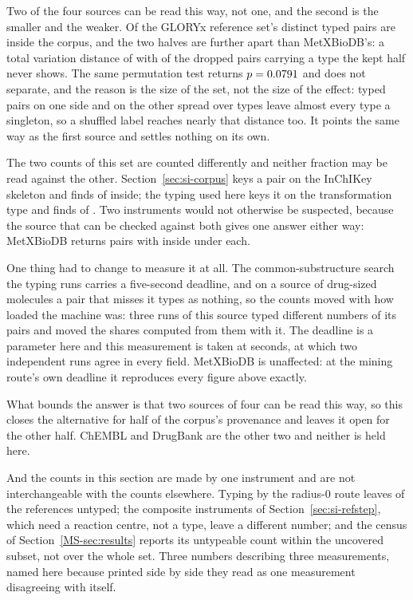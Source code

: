\documentclass[journal=jcisd8,manuscript=suppinfo,layout=onecolumn]{achemso}
\begin{document}
Two of the four sources can be read this way, not one, and the second is the smaller and the
weaker. Of the GLORYx reference set's \numGloryxdropPairs{} distinct typed pairs
\numGloryxdropInside{} are inside the corpus, and the two halves are further apart than
MetXBioDB's: a total variation distance of \numGloryxdropTv{} with
\numGloryxdropAbsentsharePct{} of the dropped pairs carrying a type the kept half never shows.
The same permutation test returns $p=0.0791$ and does not separate, and the reason is
the size of the set, not the size of the effect: \numGloryxdropKeptp{} typed pairs on one
side and \numGloryxdropDroppedp{} on the other spread over \numGloryxdropTypes{} types leave
almost every type a singleton, so a shuffled label reaches nearly that distance too. It points
the same way as the first source and settles nothing on its own.

The two counts of this set are counted differently and neither fraction may be read against the
other. Section~\ref{sec:si-corpus} keys a pair on the InChIKey skeleton and finds
\numAssemblyGloryxpairsinside{} of \numAssemblyGloryxpairs{} inside; the typing used here keys it
on the transformation type and finds \numGloryxdropInside{} of \numGloryxdropPairs{}. Two
instruments would not otherwise be suspected, because the source that can be checked against
both gives one answer either way: MetXBioDB returns \numMetxdropPairs{} pairs with
\numMetxdropInside{} inside under each.

One thing had to change to measure it at all. The common-substructure search the typing runs
carries a five-second deadline, and on a source of drug-sized molecules a pair that misses it
types as nothing, so the counts moved with how loaded the machine was: three runs of this source
typed different numbers of its pairs and moved the shares computed from them with it. The deadline
is a
parameter here and this measurement is taken at \numGloryxdropDeadline{} seconds, at which two
independent runs agree in every field. MetXBioDB is unaffected: at the mining route's own
deadline it reproduces every figure above exactly.

What bounds the answer is that two sources of four can be read this way, so this closes the
alternative for half of the corpus's provenance and leaves it open for the other half. ChEMBL and
DrugBank are the other two and neither is held here.

And the counts in this section are made by one instrument and are not interchangeable with the
counts elsewhere. Typing by the radius-0 route leaves \numTypeoverlapUntypeable{} of the
\numHydReferences{} references untyped; the composite instruments of
Section~\ref{sec:si-refstep}, which need a reaction centre, not a type, leave a different
number; and the census of Section~\ref{MS-sec:results} reports its untypeable count within the
uncovered subset, not over the whole set. Three numbers describing three measurements,
named here because printed side by side they read as one measurement disagreeing with itself.
\end{document}
